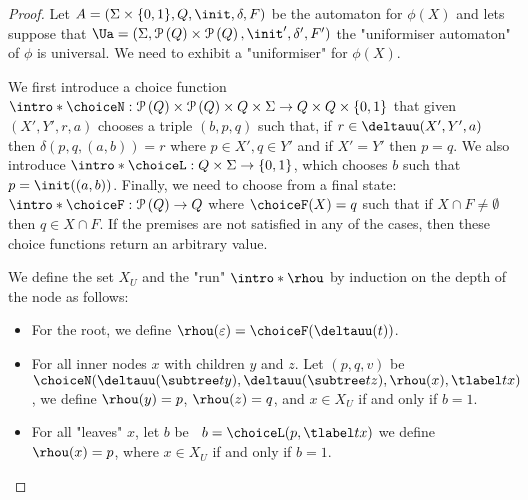 \documentclass[a4paper,UKenglish,cleveref, autoref, thm-restate]{lipics-v2021}
\begin{document}
\begin{proof}
	Let $A =  (\Sigma \times \{0,1\}, Q, \init, \delta, F)$ be the automaton for $\phi(X)$ and lets suppose that
	$\Ua = (\Sigma, \parts Q \times \parts Q,\init', \delta', F')$ the "uniformiser automaton" of $\phi$ is universal.
	We need to exhibit a "uniformiser" for $\phi(X)$.

	\AP We first introduce a choice function $\intro*\choiceN : \parts Q \times \parts Q \times Q \times \Sigma \to Q \times Q \times \set{0,1}$
	that given $(X',Y',r,a)$ chooses a triple $(b,p,q)$ such that, if $r \in \deltauu(X',Y', a)$ then $\delta(p,q,(a,b)) = r$ where $p \in X', q \in Y'$
	and if $X' = Y'$ then $p = q$.
	We also introduce $\intro* \choiceL : Q \times \Sigma \to \set{0,1} $, which chooses
	$b$ such that $p = \init((a,b))$.
	Finally, we need to choose from a final state: $\intro* \choiceF : \parts Q \to  Q$ where
	$\choiceF (X) = q$ such that if $X \cap F \neq \emptyset$ then $q \in X \cap F$. If the premises are not satisfied in any of the cases, then
	these choice functions return an arbitrary value.

	\AP We define the set $X_U$ and the "run" $\intro*\rhou$  by induction on the depth of the node as follows:
	\begin{itemize}
		\item For the root, we define $\rhou(\varepsilon) = \choiceF(\deltauu(t))$.
		\item For all inner nodes $x$ with children $y$ and $z$. Let $(p,q,v)$ be $\choiceN(\deltauu(\subtree t y), \deltauu(\subtree t z), \rhou(x), \tlabel t x)$, we define
		      $\rhou(y)=p$, $\rhou(z)=q$, and $x \in X_U$ if and only if $b = 1$.
		\item For all "leaves" $x$, let $b$ be ~$b = \choiceL(p, \tlabel t x)$ we define $\rhou (x) = p$, where $x \in X_U$ if and only if $b = 1$.
	\end{itemize}


\end{proof}
\end{document}
